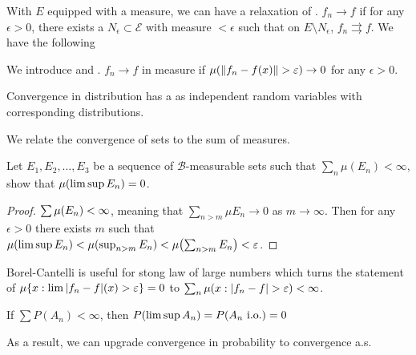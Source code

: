 With \(E\) equipped with a measure, we can have a relaxation of . \(f_{n} \to f\)  if for any \(\epsilon> 0\), there exists a \(N_{\epsilon} \subset \mathcal{E}\) with measure \(< \epsilon\) such that on \(E\setminus N_{\epsilon}\), \(f_{n} \rightrightarrows f\). We have the following

We introduce  and . \(f_{n} \to f\) in measure if \(\mu\pqty{\norm{f_{n} - f(x)} > \epsilon} \to 0\) for any \(\epsilon > 0\).

Convergence in distribution has a  as independent random variables with corresponding distributions. 

We relate the convergence of sets to the sum  of measures. 
\begin{thm}
    Let \(E_{1}, E_{2},\dots,E_{3}\) be a sequence of \(\mathcal{B}\)-measurable sets such that \(\sum_{n} \mu(E_{n}) < \infty\), show that \(\mu\pqty{\limsup E_{n}} = 0\). 
\end{thm}
\begin{proof}
    \(\sum \mu \pqty{E_{n}} < \infty\), meaning that \(\sum_{n > m} \mu E_{n} \to 0\) as \(m\to \infty\). Then for any \(\epsilon>0\) there exists \(m\) such that \(\mu\pqty{\limsup E_{n}} < \mu \pqty{\sup_{n>m} E_{n}} < \mu \pqty{\sum_{n>m} E_{n}} < \epsilon\). 
\end{proof}
\begin{remark}
    Borel-Cantelli is useful for stong law of large numbers which turns the statement of \(\mu\Bqty{x: \lim \abs{f_{n} - f} (x) > \epsilon} = 0\) to \(\sum_{n} \mu\pqty{x: \abs{f_{n} - f} > \epsilon} < \infty\). 
\end{remark}


\begin{thm}
    If \(\sum P(A_{n})< \infty\), then \(P\pqty{\limsup A_{n}} = P\pqty{A_{n} \text{ i.o.}} =0 \)
\end{thm}

As a result, we can upgrade convergence in probability to convergence a.s. 

